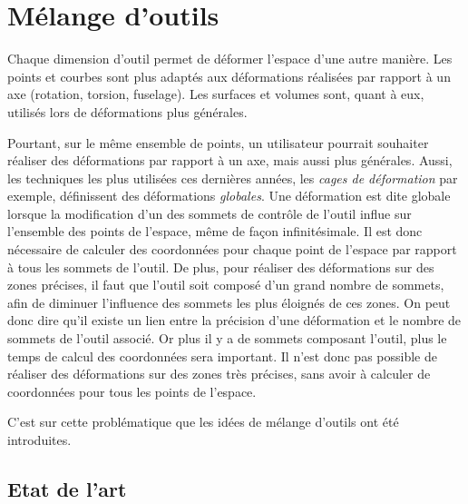 
\chapter{Mélange d'outils}

\graphicspath{ {Chapter2/Chapter2Figs/PNG/}
  {Chapter2/Chapter2Figs/PDF/} {Chapter2/Chapter2Figs/} }

Chaque dimension d'outil permet de déformer l'espace d'une autre
manière. Les points et courbes sont plus adaptés aux déformations
réalisées par rapport à un axe (rotation, torsion, fuselage). Les
surfaces et volumes sont, quant à eux, utilisés lors de déformations
plus générales.

Pourtant, sur le même ensemble de points, un utilisateur pourrait
souhaiter réaliser des déformations par rapport à un axe, mais aussi
plus générales. Aussi, les techniques les plus utilisées ces dernières
années, les \textit{cages de déformation} par exemple, définissent des
déformations \textit{globales}. Une déformation est dite globale
lorsque la modification d'un des sommets de contrôle de l'outil influe
sur l'ensemble des points de l'espace, même de façon
infinitésimale. Il est donc nécessaire de calculer des coordonnées
pour chaque point de l'espace par rapport à tous les sommets de
l'outil. De plus, pour réaliser des déformations sur des zones
précises, il faut que l'outil soit composé d'un grand nombre de
sommets, afin de diminuer l'influence des sommets les plus éloignés de
ces zones. On peut donc dire qu'il existe un lien entre la précision
d'une déformation et le nombre de sommets de l'outil associé. Or plus
il y a de sommets composant l'outil, plus le temps de calcul des
coordonnées sera important. Il n'est donc pas possible de réaliser des
déformations sur des zones très précises, sans avoir à calculer de
coordonnées pour tous les points de l'espace.

C'est sur cette problématique que les idées de mélange d'outils ont
été introduites.

\section{Etat de l'art}

